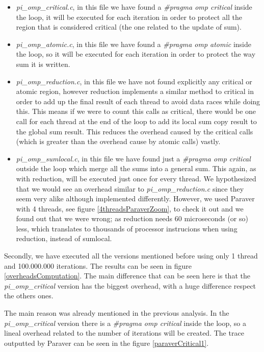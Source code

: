 \documentclass[12]{article}
\begin{document}
\begin{itemize}
\item  \textit{pi\_omp\_critical.c}, in this file we have found a \textit{\#pragma omp critical} inside the loop, it will be executed for each iteration in order to protect all the region that is considered critical (the one related to the update of sum).
\item  \textit{pi\_omp\_atomic.c}, in this file we have found a \textit{\#pragma omp atomic} inside the loop, so it will be executed for each iteration in order to protect the way sum it is written. 
\item  \textit{pi\_omp\_reduction.c}, in this file we have not found explicitly any critical or atomic region, however reduction implements a similar method to critical in order to add up the final result of each thread to avoid data races while doing this. This means if we were to count this calls as critical, there would be one call for each thread at the end of the loop to add its local sum copy result to the global sum result. This reduces the overhead caused by the critical calls (which is greater than the overhead cause by atomic calls) vastly. 
\item  \textit{pi\_omp\_sumlocal.c}, in this file we have found just a \textit{\#pragma omp critical} outside the loop which merge all the sums into a general sum. This again, as with reduction, will be executed just once for every thread. We hypothesized that we would see an overhead similar to \textit{pi\_omp\_reduction.c} since they seem very alike although implemented differently. However, we used Paraver with 4 threads, see figure \ref{4threadsParaverZoom}, to check it out and we found out that we were wrong; as reduction needs 60 microseconds (or so) less, which translates to thousands of processor instrucions when using reduction, instead of sumlocal.
\end{itemize}



Secondly, we have executed all the versions mentioned before using only 1 thread and 100.000.000 iterations. The results can be seen in figure \ref{overheadsComputation}. The main difference that can be seen here is that the \textit{pi\_omp\_critical} version has the biggest overhead, with a huge difference respect the others ones.

The main reason was already mentioned in the previous analysis. In the \textit{pi\_omp\_critical} version there is a \textit{\#pragma omp critical} inside the loop, so a lineal overhead related to the number of iterations will be created. The trace outputted by Paraver can be seen in the figure \ref{paraverCritical1}. 
\end{document}
